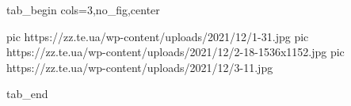 
 
 
 
 


\ifcmt
  tab_begin cols=3,no_fig,center

     pic https://zz.te.ua/wp-content/uploads/2021/12/1-31.jpg
		 pic https://zz.te.ua/wp-content/uploads/2021/12/2-18-1536x1152.jpg
		 pic https://zz.te.ua/wp-content/uploads/2021/12/3-11.jpg

  tab_end
\fi
